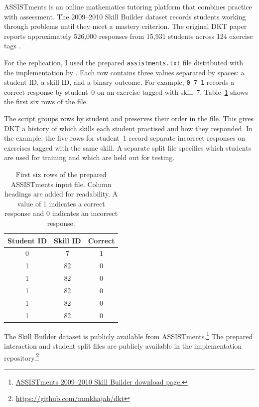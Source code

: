 \documentclass[11pt]{article}
\begin{document}
ASSISTments is an online mathematics tutoring platform that combines
practice with assessment. The 2009--2010 Skill Builder dataset records
students working through problems until they meet a mastery criterion.
The original DKT paper reports approximately 526,000 responses from
15,931 students across 124 exercise tags \citep{piech2015deep}.

For the replication, I used the prepared \texttt{assistments.txt} file
distributed with the implementation by \citet{khajah2016deep}.
Each row contains three values separated by spaces: a student ID, a
skill ID, and a binary outcome. For example, \texttt{0 7 1} records a
correct response by student~0 on an exercise tagged with skill~7.
Table~\ref{tab:assistments-formats} shows the first six rows of the file.

The script groups rows by student and preserves their order in the file.
This gives DKT a history of which skills each student practised and how
they responded. In the example, the five rows for student~1 record
separate incorrect responses on exercises tagged with the same skill.
A separate split file specifies which students are used for training
and which are held out for testing.

\begin{table}[H]
\centering
\small
\begin{tabular}{@{}ccc@{}}
\hline
Student ID & Skill ID & Correct \\
\hline
0 & 7  & 1 \\
1 & 82 & 0 \\
1 & 82 & 0 \\
1 & 82 & 0 \\
1 & 82 & 0 \\
1 & 82 & 0 \\
\hline
\end{tabular}
\caption{First six rows of the prepared ASSISTments input file.
Column headings are added for readability. A value of 1 indicates
a correct response and 0 indicates an incorrect response.}
\label{tab:assistments-formats}
\end{table}

The Skill Builder dataset is publicly
available from ASSISTments.\footnote{\href{https://sites.google.com/site/assistmentsdata/home/2009-2010-assistment-data/skill-builder-data-2009-2010}{ASSISTments 2009--2010 Skill Builder download page.}}
The prepared interaction and student split files are publicly available
in the implementation repository.\footnote{\url{https://github.com/mmkhajah/dkt}}
\end{document}
